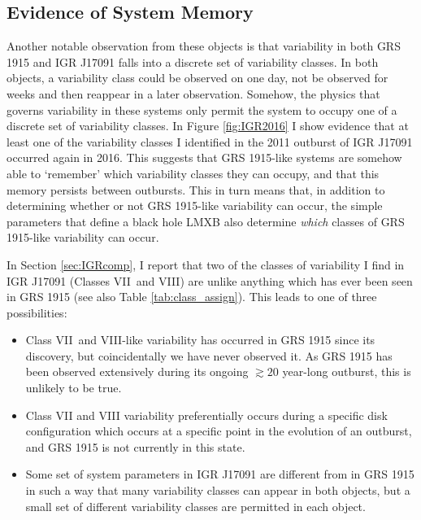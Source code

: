 \subsection{Evidence of System Memory}

\par Another notable observation from these objects is that variability in both GRS 1915 and IGR J17091 falls into a discrete set of variability classes.  In both objects, a variability class could be observed on one day, not be observed for weeks and then reappear in a later observation.  Somehow, the physics that governs variability in these systems only permit the system to occupy one of a discrete set of variability classes.  In Figure \ref{fig:IGR2016} I show evidence that at least one of the variability classes I identified in the 2011 outburst of IGR J17091 occurred again in 2016.  This suggests that GRS 1915-like systems are somehow able to `remember' which variability classes they can occupy, and that this memory persists between outbursts.  This in turn means that, in addition to determining whether or not GRS 1915-like variability can occur, the simple parameters that define a black hole LMXB also determine \textit{which} classes of GRS 1915-like variability can occur.
\par In Section \ref{sec:IGRcomp}, I report that two of the classes of variability I find in IGR J17091 (Classes VII\indexvii\ and VIII\indexviii) are unlike anything which has ever been seen in GRS 1915 (see also Table \ref{tab:class_assign}).  This leads to one of three possibilities:
\begin{itemize}
\item Class VII\indexvii\ and VIII\indexviii-like variability has occurred in GRS 1915 since its discovery, but coincidentally we have never observed it.  As GRS 1915 has been observed extensively during its ongoing $\gtrsim20$ year-long outburst, this is unlikely to be true.
\item Class VII and VIII variability preferentially occurs during a specific disk configuration which occurs at a specific point in the evolution of an outburst, and GRS 1915 is not currently in this state.
\item Some set of system parameters in IGR J17091 are different from in GRS 1915 in such a way that many variability classes can appear in both objects, but a small set of different variability classes are permitted in each object.
\end{itemize}
